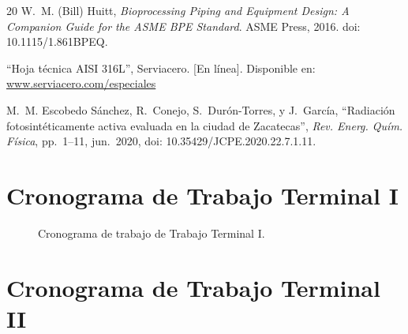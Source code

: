 \documentclass[11pt,tesis,twoside,openright,spanish]{upiiztt}
\begin{document}
\begin{thebibliography}{20}
W.~M. (Bill) Huitt, \textit{Bioprocessing Piping and Equipment Design: A Companion Guide for the ASME BPE Standard}. ASME Press, 2016. doi: 10.1115/1.861BPEQ.

``Hoja técnica AISI 316L'', Serviacero. [En línea]. Disponible en: \url{www.serviacero.com/especiales}

M.~M. Escobedo Sánchez, R.~Conejo, S.~Durón-Torres, y J.~García, ``Radiación fotosintéticamente activa evaluada en la ciudad de Zacatecas'', \textit{Rev. Energ. Quím. Física}, pp.~1--11, jun.~2020, doi: 10.35429/JCPE.2020.22.7.1.11.



\end{thebibliography}

\appendix
\chapter{Cronograma de Trabajo Terminal I}
\label{ap:cronogramaI}

\begin{figure}[H]
  \centering
  \caption{Cronograma de trabajo de Trabajo Terminal I.}
  \label{fig:cronograma1}
\end{figure}
\chapter{Cronograma de Trabajo Terminal II}
\label{ap:cronogramaII}
\end{document}
